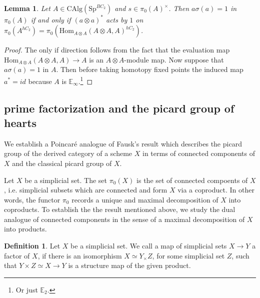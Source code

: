 \documentclass{article}
\DeclareMathOperator{\CAlgp}{CAlg^p} %
\newtheorem{lemma}[equation]{Lemma}
\theoremstyle{definition}
\newtheorem{definition}[equation]{Definition}
\newcommand{\Viktor}[1]{\todo{V: #1}}
\begin{document}
\begin{lemma}\label{lemma:unit_trivial_norm}
	Let $A\in \mathrm{CAlg}(\mathrm{Sp}^{BC_2})$ and $s\in \pi_0(A)^\times$. 
    Then $a\sigma(a)=1$ in $\pi_0(A)$ if and only if $(a\otimes a)^*$ acts by $1$ on $\pi_0(A^{hC_2})=\pi_0(\mathrm{Hom}_{A\otimes A}(A\otimes A, A)^{hC_2})$.
\end{lemma}
\begin{proof}
	The only if direction follows from the fact that the evaluation map $\mathrm{Hom}_{A\otimes A}(A\otimes A, A)\to A$ is an $A\otimes A$-module map. Now suppose that $a\sigma(a)=1$ in  $A$. Then before taking homotopy fixed points the induced map $a^*=id$ because $A$ is $\mathbb{E}_\infty$.\footnote{Or just $\mathbb{E}_2$.} 
\end{proof}

\subsection{prime factorization and the picard group of hearts}\Viktor{still in development}
We establish a Poincaré analogue of Fausk's result which describes the picard group of the derived category of a scheme $X$ in terms of connected components of $X$ and the classical picard group of $X$.

Let $X$ be a simplicial set. The set $\pi_0(X)$ is the set of connected compoents of $X$, i.e. simplicial subsets which are connected and form $X$ via a coproduct. In other words, the functor $\pi_0$ records a unique and maximal decomposition of $X$ into coproducts. To establish the the result mentioned above, we study the dual analogue of connected components in the sense of a maximal decomposition of $X$ into products. %

\begin{definition}\label{definition:factor}
    Let $X$ be a simplicial set. We call a map of simplicial sets $X\rightarrow Y$ a factor of $X$, if there is an isomorphism $X\simeq Y_\times Z$, for some simplicial set $Z$, such that $Y \times Z\simeq X\rightarrow Y$ is a structure map of the given product.
\end{definition}
\end{document}
